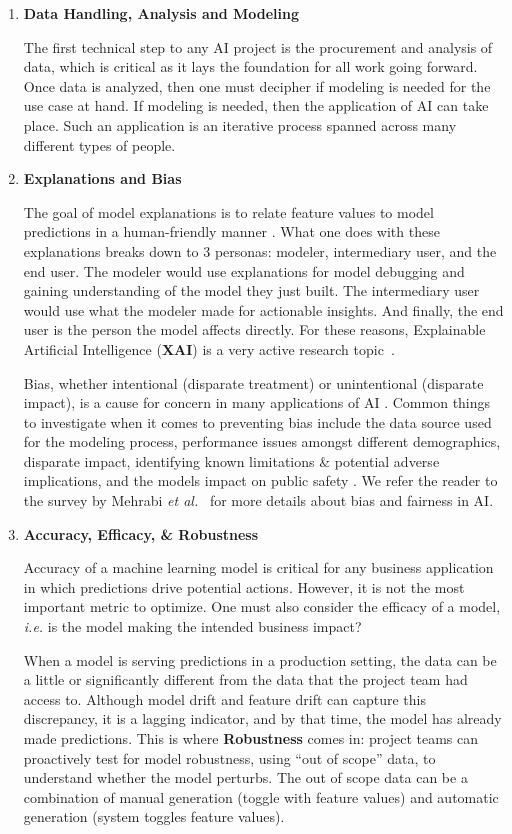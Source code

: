 \documentclass{article}
\begin{document}
\begin{enumerate}
\item \textbf{Data Handling, Analysis and Modeling}

\smallskip The first technical step to any AI project is the procurement and analysis of data, which is critical as it lays the foundation for all work going forward. Once data is analyzed, then one must decipher if modeling is needed for the use case at hand. If modeling is needed, then the application of AI can take place. Such an application is an iterative process spanned across many different types of people.

\item \textbf{Explanations and Bias}

\smallskip The goal of model explanations is to relate feature values to model predictions in a human-friendly manner \cite{molnar}. What one does with these explanations breaks down to 3 personas: modeler, intermediary user, and the end user. The modeler would use explanations for model debugging and gaining understanding of the model they just built. The intermediary user would use what the modeler made for actionable insights. And finally, the end user is the person the model affects directly. For these reasons, Explainable Artificial Intelligence (\textbf{XAI}) is a very active research topic~\cite{arrieta2020explainable, gunning2019xai}.

\smallskip Bias, whether intentional (disparate treatment) or unintentional (disparate impact), is a cause for concern in many applications of AI \cite{bias_nist, mehrabi2021survey}. Common things to investigate when it comes to preventing bias include the data source used for the modeling process, performance issues amongst different demographics, disparate impact, identifying known limitations \& potential adverse implications, and the models impact on public safety \cite{bias}. We refer the reader to the survey by Mehrabi \emph{et al.}~\cite{mehrabi2021survey} for more details about bias and fairness in AI.

\item \textbf{Accuracy, Efficacy, \& Robustness}

\smallskip Accuracy of a machine learning model is critical for any business application in which predictions drive potential actions. However, it is not the most important metric to optimize. One must also consider the efficacy of a model, \emph{i.e.} is the model making the intended business impact?

\smallskip When a model is serving predictions in a production setting, the data can be a little or significantly different from the data that the project team had access to. Although model drift and feature drift can capture this discrepancy, it is a lagging indicator, and by that time, the model has already made predictions. This is where \textbf{Robustness} comes in: project teams can proactively test for model robustness, using “out of scope” data, to understand whether the model perturbs. The out of scope data can be a combination of manual generation (toggle with feature values) and automatic generation (system toggles feature values).


\end{enumerate}
\end{document}
